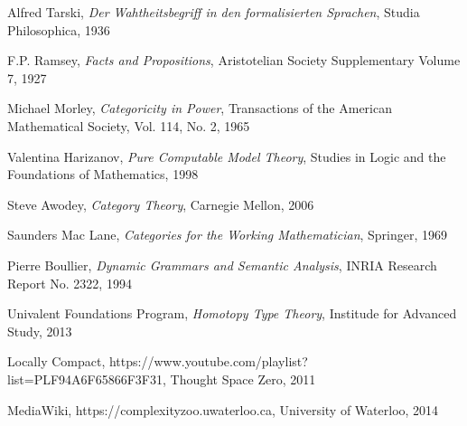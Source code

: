\documentclass{article}
\begin{document}
\begin{thebibliography}{99}
    Alfred Tarski,
    \emph{Der Wahtheitsbegriff in den formalisierten Sprachen},
    Studia Philosophica,
    1936

    F.P. Ramsey,
    \emph{Facts and Propositions},
    Aristotelian Society Supplementary Volume 7,
    1927

    Michael Morley,
    \emph{Categoricity in Power},
    Transactions of the American Mathematical Society, Vol. 114, No. 2,
    1965

    Valentina Harizanov,
    \emph{Pure Computable Model Theory},
    Studies in Logic and the Foundations of Mathematics,
    1998

    Steve Awodey,
    \emph{Category Theory},
    Carnegie Mellon,
    2006

    Saunders Mac Lane,
    \emph{Categories for the Working Mathematician},
    Springer,
    1969

    Pierre Boullier,
    \emph{Dynamic Grammars and Semantic Analysis},
    INRIA Research Report No. 2322,
    1994

    Univalent Foundations Program,
    \emph{Homotopy Type Theory},
    Institude for Advanced Study,
    2013

    Locally Compact,
    https://www.youtube.com/playlist?list=PLF94A6F65866F3F31,
    Thought Space Zero,
    2011

    MediaWiki,
    https://complexityzoo.uwaterloo.ca,
    University of Waterloo,
    2014

\end{thebibliography}

\end{document}
